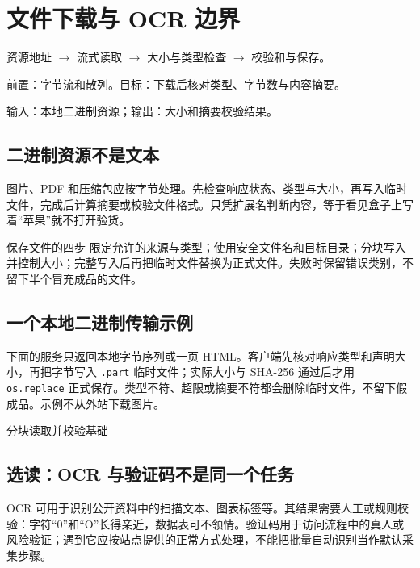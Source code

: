 \chapter{文件下载与 OCR 边界}\label{ch:files}
\begin{tcolorbox}[title=章首知识地图,colframe=Ink]
资源地址 $\longrightarrow$ 流式读取 $\longrightarrow$ 大小与类型检查 $\longrightarrow$ 校验和与保存。
\end{tcolorbox}

\begin{tcolorbox}[title=学习目标与前置知识,colframe=Ink!65,colback=Ink!2]
前置：字节流和散列。目标：下载后核对类型、字节数与内容摘要。\par
输入：本地二进制资源；输出：大小和摘要校验结果。
\end{tcolorbox}

\section{二进制资源不是文本}
图片、PDF 和压缩包应按字节处理。先检查响应状态、类型与大小，再写入临时文件，完成后计算摘要或校验文件格式。只凭扩展名判断内容，等于看见盒子上写着“苹果”就不打开验货。

\begin{method}{保存文件的四步}
限定允许的来源与类型；使用安全文件名和目标目录；分块写入并控制大小；完整写入后再把临时文件替换为正式文件。失败时保留错误类别，不留下半个冒充成品的文件。
\end{method}

\section{一个本地二进制传输示例}
下面的服务只返回本地字节序列或一页 HTML。客户端先核对响应类型和声明大小，再把字节写入 \texttt{.part} 临时文件；实际大小与 SHA-256 通过后才用 \texttt{os.replace} 正式保存。类型不符、超限或摘要不符都会删除临时文件，不留下假成品。示例不从外站下载图片。

\begin{example}{分块读取并校验}{基础}
\end{example}

\section{选读：OCR 与验证码不是同一个任务}
OCR 可用于识别公开资料中的扫描文本、图表标签等。其结果需要人工或规则校验：字符“0”和“O”长得亲近，数据表可不领情。验证码用于访问流程中的真人或风险验证；遇到它应按站点提供的正常方式处理，不能把批量自动识别当作默认采集步骤。

